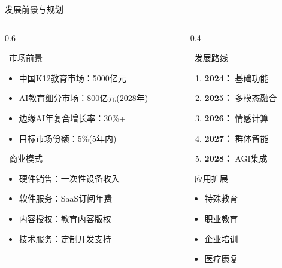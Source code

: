 \documentclass[aspectratio=169,12pt]{beamer}
\begin{document}
\begin{frame}{发展前景与规划}
    \begin{columns}
        \begin{column}{0.6\textwidth}
            \begin{block}{\faChartLine\ 市场前景}
                \begin{itemize}
                    \item 中国K12教育市场：5000亿元
                    \item AI教育细分市场：800亿元(2028年)
                    \item 边缘AI年复合增长率：30\%+
                    \item 目标市场份额：5\%(5年内)
                \end{itemize}
            \end{block}
            
            \begin{block}{\faIndustry\ 商业模式}
                \begin{itemize}
                    \item 硬件销售：一次性设备收入
                    \item 软件服务：SaaS订阅年费
                    \item 内容授权：教育内容版权
                    \item 技术服务：定制开发支持
                \end{itemize}
            \end{block}
        \end{column}
        \begin{column}{0.4\textwidth}
            \begin{block}{\faRoad\ 发展路线}
                \begin{enumerate}
                    \item \textbf{2024：} 基础功能
                    \item \textbf{2025：} 多模态融合
                    \item \textbf{2026：} 情感计算
                    \item \textbf{2027：} 群体智能
                    \item \textbf{2028：} AGI集成
                \end{enumerate}
            \end{block}
            
            \begin{block}{\faExpand\ 应用扩展}
                \begin{itemize}
                    \item 特殊教育
                    \item 职业教育
                    \item 企业培训
                    \item 医疗康复
                \end{itemize}
            \end{block}
        \end{column}
    \end{columns}
\end{frame}
\end{document}
